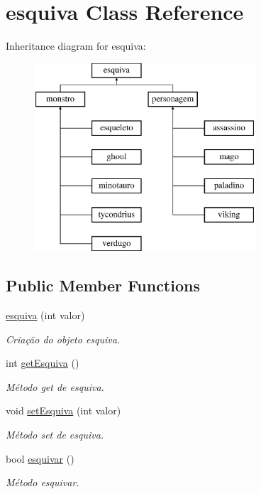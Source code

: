 \hypertarget{classesquiva}{}\section{esquiva Class Reference}
\label{classesquiva}
Inheritance diagram for esquiva\+:\begin{figure}[H]
\begin{center}
\leavevmode
\includegraphics[height=7.000000cm]{classesquiva}
\end{center}
\end{figure}
\subsection*{Public Member Functions}
\begin{DoxyCompactItemize}
\item 
\mbox{\hyperlink{classesquiva_af611f7fe8c69b85f58e1d3eb41af611a}{esquiva}} (int valor)
\begin{DoxyCompactList}\small\item\em Criação do objeto esquiva. \end{DoxyCompactList}\item 
int \mbox{\hyperlink{classesquiva_a0defb7805011650e62e3e8c1cf362a53}{get\+Esquiva}} ()
\begin{DoxyCompactList}\small\item\em Método get de esquiva. \end{DoxyCompactList}\item 
void \mbox{\hyperlink{classesquiva_a782b543697b0578e0f8efaed5b631209}{set\+Esquiva}} (int valor)
\begin{DoxyCompactList}\small\item\em Método set de esquiva. \end{DoxyCompactList}\item 
bool \mbox{\hyperlink{classesquiva_a52c90c2a26c3d27e1549e5469c49c1bb}{esquivar}} ()
\begin{DoxyCompactList}\small\item\em Método esquivar. \end{DoxyCompactList}\end{DoxyCompactItemize}



